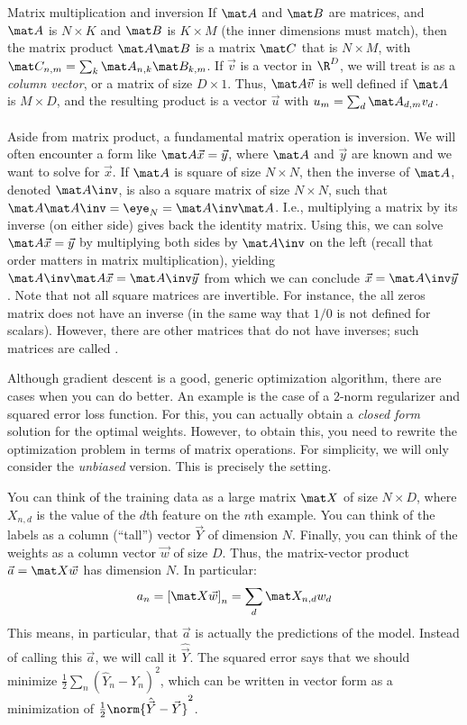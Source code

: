 \begin{mathreview}{Matrix multiplication and inversion}
  If $\mat A$ and $\mat B$ are matrices, and $\mat A$ is $N \times K$ and $\mat B$ is $K \times M$ (the inner dimensions must match), then the matrix product $\mat A \mat B$ is a matrix $\mat C$ that is $N \times M$, with $\mat C_{n,m} = \sum_k \mat A_{n,k} \mat B_{k,m}$.
If $\vec v$ is a vector in $\R^D$, we will treat is as a \emph{column vector}, or a matrix of size $D \times 1$.
Thus, $\mat A \vec v$ is well defined if $\mat A$ is $M \times D$, and the resulting product is a vector $\vec u$ with $u_m = \sum_d \mat A_{d,m} v_d$.
  ~\\~\\
  Aside from matrix product, a fundamental matrix operation is inversion. We will often encounter a form like $\mat A \vec x = \vec y$, where $\mat A$ and $\vec y$ are known and we want to solve for $\vec x$.
  If $\mat A$ is square of size $N \times N$, then the inverse of $\mat A$, denoted $\mat A\inv$, is also a square matrix of size $N \times N$, such that $\mat A \mat A\inv = \eye_N = \mat A\inv \mat A$. I.e., multiplying a matrix by its inverse (on either side) gives back the identity matrix.
  Using this, we can solve $\mat A \vec x = \vec y$ by multiplying both sides by $\mat A\inv$ on the left (recall that order matters in matrix multiplication), yielding $\mat A\inv \mat A \vec x = \mat A\inv \vec y$ from which we can conclude $\vec x = \mat A\inv\vec y$.
  Note that not all square matrices are invertible. For instance, the all zeros matrix does not have an inverse (in the same way that $1/0$ is not defined for scalars).
  However, there are other matrices that do not have inverses; such matrices are called .
\end{mathreview}

Although gradient descent is a good, generic optimization algorithm,
there are cases when you can do better.  An example is the case of a
$2$-norm regularizer and squared error loss function.  For this, you
can actually obtain a \emph{closed form} solution for the optimal
weights.  However, to obtain this, you need to rewrite the
optimization problem in terms of matrix operations.  For simplicity,
we will only consider the \emph{unbiased} version.
This is precisely the  setting.

You can think of the training data as a large matrix $\mat X$ of size
$N \times D$, where $X_{n,d}$ is the value of the $d$th feature on the
$n$th example.  You can think of the labels as a column (``tall'')
vector $\vec Y$ of dimension $N$.  Finally, you can think of the
weights as a column vector $\vec w$ of size $D$.  Thus, the
matrix-vector product $\vec a = \mat X \vec w$ has dimension $N$.  In
particular:
%
\begin{equation}
a_n
= \left[ \mat X \vec w \right]_n
= \sum_d \mat X_{n,d} w_d
\end{equation}
%
This means, in particular, that $\vec a$ is actually the predictions
of the model.  Instead of calling this $\vec a$, we will call it
$\hat{\vec Y}$.  The squared error says that we should minimize $\frac 1
2 \sum_n (\hat Y_n - Y_n)^2$, which can be written in vector form as a
minimization of $\frac 1 2 \norm{\hat{\vec Y} - \vec Y}^2$.

